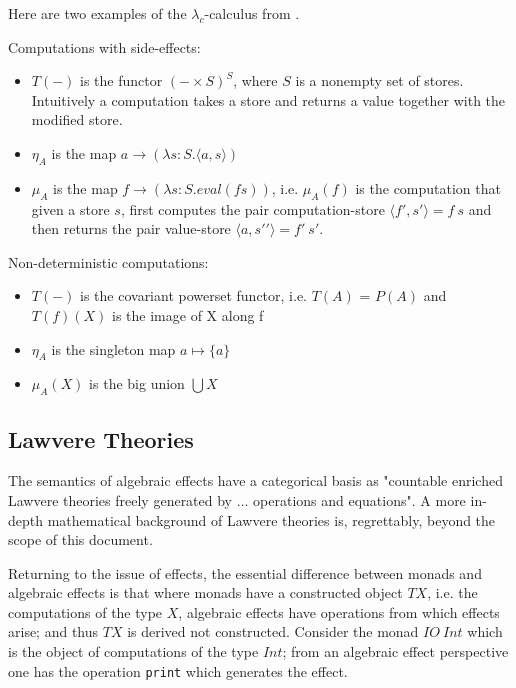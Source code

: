 Here are two examples of the $\lambda_c$-calculus from
\cite{moggi1989computational}\cite{moggi1991notions}.
\vspace{5mm}

\begin{example}\label{lc1}
\end{example}
    Computations with side-effects:
    \begin{itemize}
        \item $T(-)$ is the functor $(-\times S)^S$, where $S$ is a nonempty set of stores.
            Intuitively a computation takes a store and returns a value together with the modified store.
        \item $\eta_A$ is the map $a \rightarrow (\lambda s:S.\langle a,s \rangle)$
        \item $\mu_A$ is the map $f \rightarrow (\lambda s:S.eval(fs))$,
            i.e. $\mu_A(f)$ is the computation that given a store $s$,
            first computes the pair computation-store $\langle f\prime,s\prime\rangle = f\ s$
            and then returns the pair value-store $\langle a,s\prime\prime\rangle = f\prime\ s\prime$.
    \end{itemize}
\vspace{5mm}

\begin{example}
    Non-deterministic computations:
    \begin{itemize}
        \item $T(-)$ is the covariant powerset functor,
            i.e.  $T(A)$ = $P(A)$ and $T(f)(X)$ is the image of X along f
        \item $\eta_A$ is the singleton map $a \mapsto  \{a\}$
        \item $\mu_A(X)$ is the big union $\bigcup X$
    \end{itemize}
\end{example}

\subsection{Lawvere Theories}
The semantics of algebraic effects have a categorical basis as
"countable enriched Lawvere theories freely generated by $\dots$ operations and equations".
\cite{plotkin2004computational}
A more in-depth mathematical background of Lawvere theories is,
regrettably, beyond the scope of this document.

Returning to the issue of effects,
the essential difference between monads and algebraic effects is that
where monads have a constructed object $TX$,
i.e. the computations of the type $X$,
algebraic effects have operations from which effects arise;
and thus $TX$ is derived not constructed.
Consider the monad $IO\ Int$ which is the object of computations
of the type $Int$;
from an algebraic effect perspective
one has the operation \texttt{print} which generates the effect.\\

